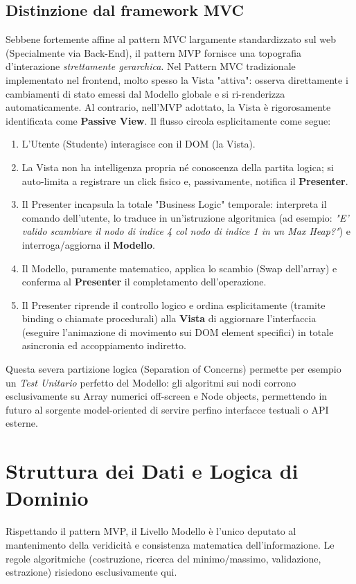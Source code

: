 \documentclass[openany]{theme/uniprthesis}
\begin{document}
\subsection{Distinzione dal framework MVC}
Sebbene fortemente affine al pattern MVC largamente standardizzato sul web (Specialmente via Back-End), il pattern MVP fornisce una topografia d'interazione \textit{strettamente gerarchica}.
Nel Pattern MVC tradizionale implementato nel frontend, molto spesso la Vista  "attiva": osserva direttamente i cambiamenti di stato emessi dal Modello globale e si ri-renderizza automaticamente.
Al contrario, nell'MVP adottato, la Vista è rigorosamente identificata come \textbf{Passive View}. Il flusso circola esplicitamente come segue:
\begin{enumerate}
    \item L'Utente (Studente) interagisce con il DOM (la Vista).
    \item La Vista non ha intelligenza propria né conoscenza della partita logica; si auto-limita a registrare un click fisico e, passivamente, notifica il \textbf{Presenter}.
    \item Il Presenter incapsula la totale "Business Logic" temporale: interpreta il comando dell'utente, lo traduce in un'istruzione algoritmica (ad esempio: \textit{"E' valido scambiare il nodo di indice 4 col nodo di indice 1 in un Max Heap?"}) e interroga/aggiorna il \textbf{Modello}.
    \item Il Modello, puramente matematico, applica lo scambio (Swap dell'array) e conferma al \textbf{Presenter} il completamento dell'operazione.
    \item Il Presenter riprende il controllo logico e ordina esplicitamente (tramite binding o chiamate procedurali) alla \textbf{Vista} di aggiornare l'interfaccia (eseguire l'animazione di movimento sui DOM element specifici) in totale asincronia ed accoppiamento indiretto.
\end{enumerate}

Questa severa partizione logica (Separation of Concerns) permette per esempio un \textit{Test Unitario} perfetto del Modello: gli algoritmi sui nodi corrono esclusivamente su Array numerici off-screen e Node objects, permettendo in futuro al sorgente model-oriented di servire perfino interfacce testuali o API esterne.

\section{Struttura dei Dati e Logica di Dominio}
Rispettando il pattern MVP, il Livello Modello è l'unico deputato al mantenimento della veridicità e consistenza matematica dell'informazione. Le regole algoritmiche (costruzione, ricerca del minimo/massimo, validazione, estrazione) risiedono esclusivamente qui.
\end{document}
